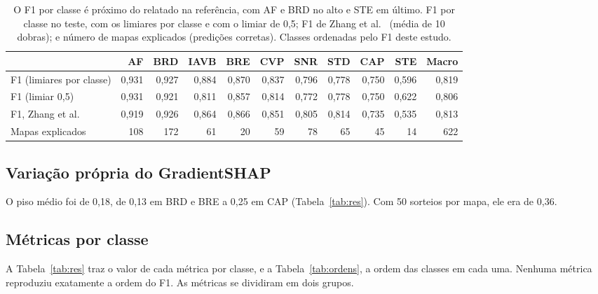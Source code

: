 \begin{table}[!t]\centering
\caption{O F1 por classe é próximo do relatado na referência, com AF e BRD no alto e STE em último. F1 por classe no teste, com os limiares por classe e com o limiar de 0,5; F1 de Zhang et al.~\cite{zhang2021} (média de 10 dobras); e número de mapas explicados (predições corretas). Classes ordenadas pelo F1 deste estudo.}\label{tab:f1}
\begin{tabular}{lrrrrrrrrr|r}
\toprule
& AF & BRD & IAVB & BRE & CVP & SNR & STD & CAP & STE & Macro \\
\midrule
F1 (limiares por classe) & 0,931 & 0,927 & 0,884 & 0,870 & 0,837 & 0,796 & 0,778 & 0,750 & 0,596 & 0,819 \\
F1 (limiar 0,5) & 0,931 & 0,921 & 0,811 & 0,857 & 0,814 & 0,772 & 0,778 & 0,750 & 0,622 & 0,806 \\
F1, Zhang et al.~\cite{zhang2021} & 0,919 & 0,926 & 0,864 & 0,866 & 0,851 & 0,805 & 0,814 & 0,735 & 0,535 & 0,813 \\
Mapas explicados & 108 & 172 & 61 & 20 & 59 & 78 & 65 & 45 & 14 & 622 \\
\bottomrule
\end{tabular}
\end{table}

\subsection{Variação própria do GradientSHAP}
O piso médio foi de 0,18, de 0,13 em BRD e BRE a 0,25 em CAP (Tabela~\ref{tab:res}). Com 50 sorteios por mapa, ele era de 0,36.

\subsection{Métricas por classe}
A Tabela~\ref{tab:res} traz o valor de cada métrica por classe, e a Tabela~\ref{tab:ordens}, a ordem das classes em cada uma. Nenhuma métrica reproduziu exatamente a ordem do F1. As métricas se dividiram em dois grupos.

